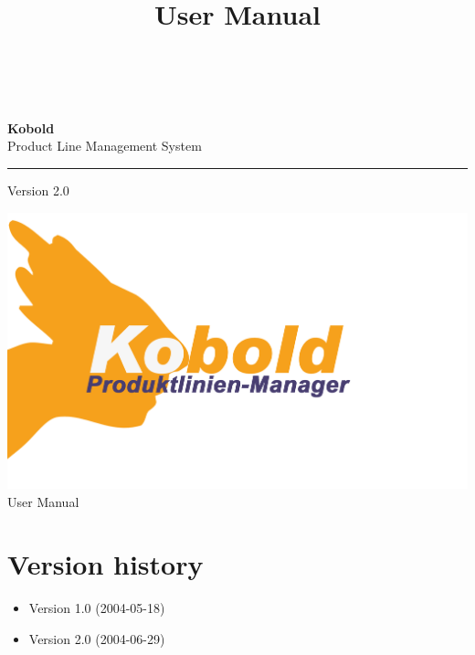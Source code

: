 \documentclass[a4paper,titlepage,12pt]{scrbook}
\title {\huge \product\\[0.5cm]\large User Manual \\[0.5cm] \version
  \\[1cm] \Large \company}
\newcommand\version{Version 2.0\xspace}
\begin{document}

\begin{titlepage}
\renewcommand{\thefootnote}{\fnsymbol{footnote}}
{\Huge
\raggedright
\textbf{\bf Kobold} \\
\huge Product Line Management System
\rule{\textwidth}{0.75pt}
\par
}
\begin{flushleft}
\normalsize
\version
\end{flushleft}


\vfill
\includegraphics[width=15cm]{../common/logo-color.png}
\vfill
{\parindent=0cm
\Huge User Manual
}


\setcounter{footnote}{0}
\end{titlepage}


\section*{Version history}

\begin{itemize}

\item Version 1.0 (2004-05-18)
\item Version 2.0 (2004-06-29)

\end{itemize}

\tableofcontents








\end{document}
